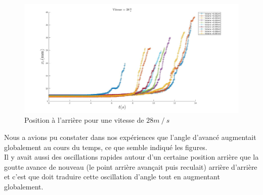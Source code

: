 \documentclass[french]{article}
\begin{document}
\begin{figure}[h]
	\centering
	\includegraphics[width = \linewidth]{./image/v=28xr.jpg}
	\caption{Position à l'arrière pour une vitesse de $28m\mathbin{/}s$}
\end{figure}

Nous a avions pu constater dans nos expériences que l'angle d'avancé augmentait globalement au cours du temps, ce que semble indiqué les figures.\\

Il y avait aussi des oscillations rapides autour d'un certaine position arrière que la goutte avance de nouveau (le point arrière avançait puis reculait) arrière d'arrière et c'est que doit traduire cette oscillation d'angle tout en augmentant globalement.
\end{document}
